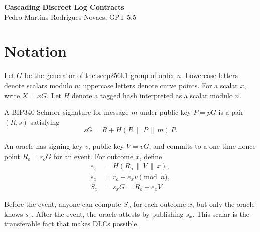 \documentclass[11pt,a4paper]{article}
\theoremstyle{claimstyle}
\begin{document}
\author{Pedro Martins Rodrigues Novaes}
\begin{center}
{\LARGE\bfseries Cascading Discreet Log Contracts}\\[0.7em]
{\large Pedro Martins Rodrigues Novaes, GPT 5.5}
\end{center}

\begin{abstract}
Cascading Discreet Log Contracts, or cDLCs, are a construction for composing
DLCs into finite graphs of conditionally activated Bitcoin transactions. For
each parent outcome \(x\), the oracle attestation point \(S_x\) is used as the
adaptor point for signatures on a bridge transaction that spends the parent
outcome output into a prepared child funding output. When the oracle later
reveals the attestation scalar \(s_x\), the same scalar that settles the parent
outcome also completes the bridge signatures and funds the child DLC.
\end{abstract}

\tableofcontents
\newpage

\section{Notation}

Let $G$ be the generator of the secp256k1 group of order $n$. Lowercase
letters denote scalars modulo $n$; uppercase letters denote curve points. For a
scalar $x$, write $X = xG$. Let $H$ denote a tagged hash interpreted as a
scalar modulo $n$.

A BIP340 Schnorr signature for message $m$ under public key $P = pG$ is a pair
$(R,s)$ satisfying
\[
  sG = R + H(R \,\|\, P \,\|\, m)\,P.
\]

An oracle has signing key $v$, public key $V = vG$, and commits to a one-time
nonce point $R_o = r_o G$ for an event. For outcome $x$, define
\begin{align*}
  e_x &= H(R_o \,\|\, V \,\|\, x),\\
  s_x &= r_o + e_x v \pmod{n},\\
  S_x &= s_x G = R_o + e_x V.
\end{align*}

Before the event, anyone can compute $S_x$ for each outcome $x$, but only the
oracle knows $s_x$. After the event, the oracle attests by publishing $s_x$.
This scalar is the transferable fact that makes DLCs possible.
\end{document}
